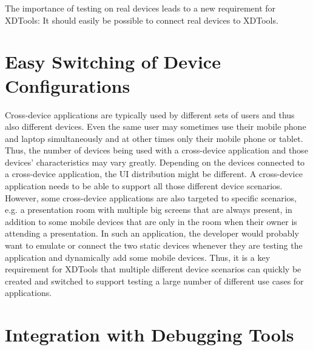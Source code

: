 The importance of testing on real devices leads to a new requirement for XDTools: It should easily be possible to connect real devices to XDTools. 

\section{Easy Switching of Device Configurations}

Cross-device applications are typically used by different sets of users and thus also different devices. Even the same user may sometimes use their mobile phone and laptop simultaneously and at other times only their mobile phone or tablet. Thus, the number of devices being used with a cross-device application and those devices' characteristics may vary greatly. Depending on the devices connected to a cross-device application, the UI distribution might be different. A cross-device application needs to be able to support all those different device scenarios. However, some cross-device applications are also targeted to specific scenarios, e.g. a presentation room with multiple big screens that are always present, in addition to some mobile devices that are only in the room when their owner is attending a presentation. In such an application, the developer would probably want to emulate or connect the two static devices whenever they are testing the application and dynamically add some mobile devices. Thus, it is a key requirement for XDTools that multiple different device scenarios can quickly be created and switched to support testing a large number of different use cases for applications. 

\section{Integration with Debugging Tools}

